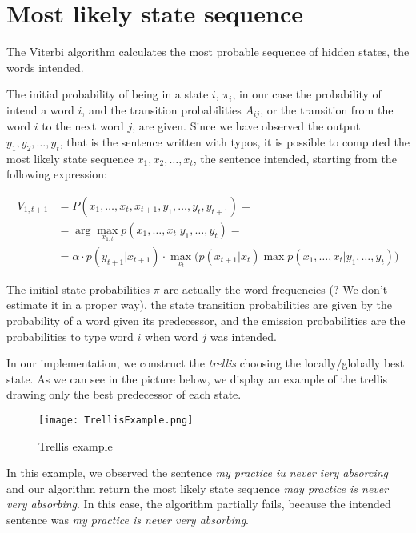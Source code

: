 \section{Most likely state sequence}

The Viterbi algorithm calculates the most probable sequence of hidden states, the words intended.

The initial probability of being in a state $i$, $\pi_i$, in our case the probability of intend a word $i$, and the 
transition probabilities $A_{ij}$, or the transition from the word $i$ to the next word $j$, are given. Since we have 
observed the output $y_1, y_2, \dots , y_t$, that is the sentence written with typos, it is possible to computed the most 
likely state sequence $x_1, x_2, \dots , x_t$, the sentence intended, starting from the following expression:

\begin{equation}
	\begin{aligned}
		V_{1,t+1} &= P(x_1, \dots, x_t, x_{t+1}, y_1, \dots, y_t,  y_{t+1}) = \\
						&= \arg\max_{x_{1:t}} p(x_1, \dots, x_t | y_1, \dots, y_t) = \\
						& =  \alpha \cdot p(y_{t+1}|x_{t+1})\cdot\max_{x_t} \Big( p(x_{t+1}|x_t) \max p(x_1, \dots, x_{t}|y_1, 
						\dots, y_t)\Big)
	\end{aligned}
\end{equation}

The initial state probabilities $\pi$ are actually the word frequencies (? We don’t estimate it in a proper way), the state 
transition probabilities are given by the probability of a word given its predecessor, and the emission probabilities are the 
probabilities to type word $i$ when word $j$ was intended.

In our implementation, we construct the \textit{trellis} choosing the locally/globally best state. As we can see in the 
picture below, we display an example of the trellis drawing only the best predecessor of each state.

\begin{figure}[H]
	\centering
	\texttt{[image: TrellisExample.png]}
	\caption{Trellis example}
	\label{fig:trellis}
\end{figure}

In this example, we observed the sentence \textsl{my practice iu never iery absorcing} and our algorithm return the most 
likely state sequence \textsl{may practice is never very absorbing}. In this case, the algorithm partially fails, because the 
intended sentence was \textsl{my practice is never very absorbing}.
\\

